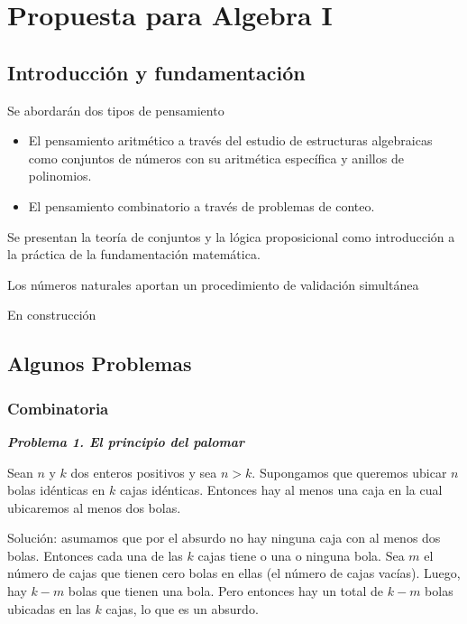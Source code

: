 \documentclass[a4paper,10pt,BCOR10mm,oneside,headsepline]{scrbook}
\newlength{\gb}
\begin{document}
 \section{Propuesta para Algebra I } 
 
 

\subsection{Introducción y fundamentación}

 

Se abordarán dos tipos de pensamiento

\begin{itemize}
\item El pensamiento aritmético a través del estudio de estructuras algebraicas como conjuntos de números con su aritmética específica y anillos de polinomios.
\item El pensamiento combinatorio a través de problemas de conteo. 
\end{itemize}


Se presentan la teoría de conjuntos y la lógica proposicional como introducción a la práctica de la fundamentación matemática. 

Los números naturales aportan un procedimiento de validación simultánea 




\textcolor[rgb]{1,0,0}{En construcción}





\subsection{Algunos Problemas }

\subsubsection{Combinatoria}

 
\noindent  \textit{\textbf{Problema 1.    El principio del palomar }} 


Sean $n$ y $k$ dos enteros positivos y sea $n>k$. Supongamos que queremos ubicar $n$ bolas idénticas en $k$ cajas idénticas. Entonces hay al menos una caja en la cual ubicaremos al menos dos bolas.

Solución: asumamos que por el absurdo no hay ninguna caja con al menos dos bolas. Entonces cada una de las $k$ cajas tiene o una o ninguna bola. Sea $m$ el número de cajas que tienen cero bolas en ellas (el número de cajas vacías). Luego, hay $k-m$ bolas que tienen una bola. Pero entonces hay un total de $k-m$ bolas ubicadas en las $k$ cajas, lo que es un absurdo.
\end{document}

